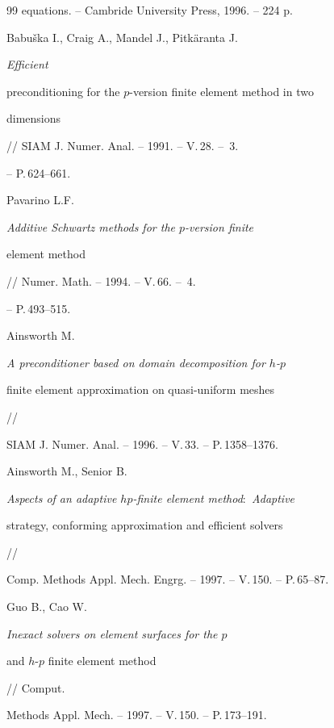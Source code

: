 \begin{thebibliography}{99}
{equations}. -- Cambride University Press, 1996. -- 224 p. %







Babu\v{s}ka I., Craig A., Mandel J., Pitk\"{a}ranta J. {\it Efficient 


preconditioning for the $p$-version finite element method in two 


dimensions} // SIAM J. Numer. Anal. -- 1991. -- V.\,28. -- \No\,3.


-- P.\,624--661.







Pavarino L.F. {\it Additive Schwartz methods for the $p$-version finite


element method} // Numer. Math. -- 1994. -- V.\,66. -- \No\,4. 


-- P.\,493--515.







Ainsworth M.


{\it A preconditioner based on domain decomposition for $h$-$p$


finite element approximation on quasi-uniform meshes} //


SIAM J. Numer. Anal. -- 1996. -- V.\,33. -- P.\,1358--1376.







Ainsworth M., Senior B.


{\it Aspects of an adaptive $hp$-finite element method\/${:}$ Adaptive


strategy, conforming approximation and efficient solvers} //


Comp. Methods Appl. Mech. Engrg. -- 1997. -- V.\,150. -- P.\,65--87.







Guo B., Cao W. {\it Inexact solvers on element surfaces for the $p$


and $h$-$p$ finite element method} // Comput.


Methods Appl. Mech. -- 1997. -- V.\,150. -- P.\,173--191.






\end{thebibliography}
